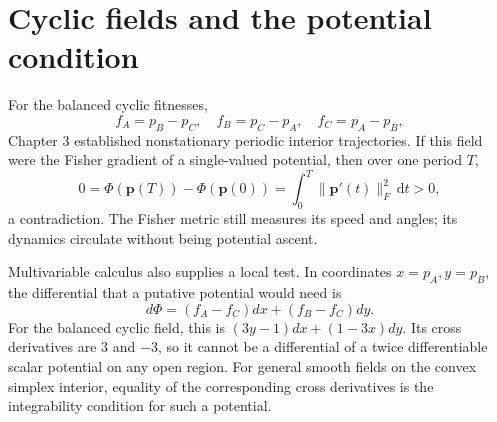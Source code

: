 \documentclass[11pt,oneside,openany]{book}
\theoremstyle{definition}
\theoremstyle{remark}
\newcommand{\dd}{\,\mathrm{d}}
\newcommand{\p}{\mathbf{p}}
\numberwithin{equation}{chapter}
\begin{document}
\section{Cyclic fields and the potential condition}
For the balanced cyclic fitnesses,
\[
f_A=p_B-p_C,\quad f_B=p_C-p_A,\quad f_C=p_A-p_B,
\]
Chapter 3 established nonstationary periodic interior trajectories. If this field were the Fisher gradient of a single-valued potential, then over one period $T$,
\[
0=\Phi(\p(T))-\Phi(\p(0))
=\int_0^T\|\p'(t)\|_F^2\dd t>0,
\]
a contradiction. The Fisher metric still measures its speed and angles; its dynamics circulate without being potential ascent.

Multivariable calculus also supplies a local test. In coordinates $x=p_A,y=p_B$, the differential that a putative potential would need is
\[
d\Phi=(f_A-f_C)dx+(f_B-f_C)dy.
\]
For the balanced cyclic field, this is $(3y-1)dx+(1-3x)dy$. Its cross derivatives are $3$ and $-3$, so it cannot be a differential of a twice differentiable scalar potential on any open region. For general smooth fields on the convex simplex interior, equality of the corresponding cross derivatives is the integrability condition for such a potential.
\end{document}

